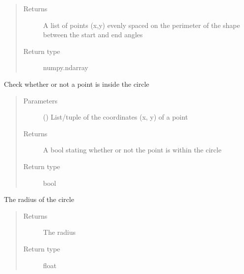 \documentclass[letterpaper,10pt,english]{sphinxmanual}
\begin{document}
\begin{fulllineitems}
\begin{fulllineitems}
\begin{quote}
\begin{description}
\begin{itemize}
\end{itemize}

\item[{Returns}] \leavevmode
A list of points (x,y) evenly spaced on the perimeter of the shape between the start and end angles

\item[{Return type}] \leavevmode
numpy.ndarray

\end{description}\end{quote}

\end{fulllineitems}


\begin{fulllineitems}
\label{\detokenize{source/pyzones:pyzones.Circle.is_point_inside}}
Check whether or not a point is inside the circle
\begin{quote}\begin{description}
\item[{Parameters}] \leavevmode
{} () \textendash{} List/tuple of the coordinates (x, y) of a point

\item[{Returns}] \leavevmode
A bool stating whether or not the point is within the circle

\item[{Return type}] \leavevmode
bool

\end{description}\end{quote}

\end{fulllineitems}


\begin{fulllineitems}
\label{\detokenize{source/pyzones:pyzones.Circle.radius}}
The radius of the circle
\begin{quote}\begin{description}
\item[{Returns}] \leavevmode
The radius

\item[{Return type}] \leavevmode
float

\end{description}\end{quote}

\end{fulllineitems}


\end{fulllineitems}
\end{document}
